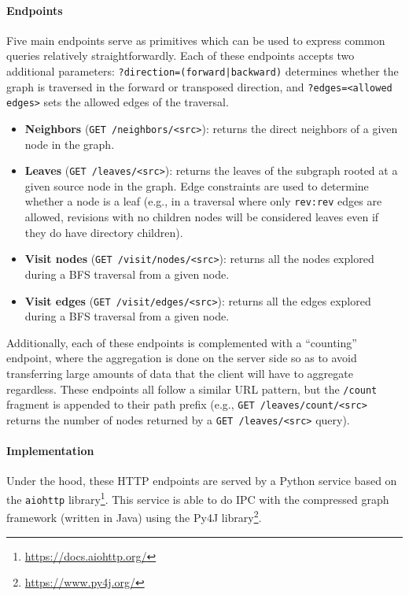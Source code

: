 \paragraph*{Endpoints}

Five main endpoints serve as primitives which can be used to express common
queries relatively straightforwardly. Each of these endpoints accepts two
additional parameters: \texttt{?direction=(forward|backward)} determines whether
the graph is traversed in the forward or transposed direction, and
\texttt{?edges=<allowed edges>} sets the allowed edges of the traversal.

\begin{itemize}
    \item \textbf{Neighbors} (\texttt{GET /neighbors/<src>}): returns the
        direct neighbors of a given node in the graph.
    \item \textbf{Leaves} (\texttt{GET /leaves/<src>}): returns the
        leaves of the subgraph rooted at a given source node in the graph. Edge
        constraints are used to determine whether a node is a leaf (e.g., in a
        traversal where only \texttt{rev:rev} edges are allowed, revisions with
        no children nodes will be considered leaves even if they do have
        directory children).
    \item \textbf{Visit nodes} (\texttt{GET /visit/nodes/<src>}): returns all
        the nodes explored during a \gls{BFS} traversal from a given node.
    \item \textbf{Visit edges} (\texttt{GET /visit/edges/<src>}): returns all
        the edges explored during a \gls{BFS} traversal from a given node.
\end{itemize}

Additionally, each of these endpoints is complemented with a ``counting''
endpoint, where the aggregation is done on the server side so as to avoid
transferring large amounts of data that the client will have to aggregate
regardless. These endpoints all follow a similar URL pattern, but the
\texttt{/count} fragment is appended to their path prefix (e.g., \texttt{GET
/leaves/count/<src>} returns the number of nodes returned by a \texttt{GET
/leaves/<src>} query).

\paragraph*{Implementation}

Under the hood, these HTTP endpoints are served by a Python service based on
the \texttt{aiohttp} library\footnote{\url{https://docs.aiohttp.org/}}. This
service is able to do \gls{IPC} with the compressed graph framework (written in
Java) using the Py4J library\footnote{\url{https://www.py4j.org/}}.

